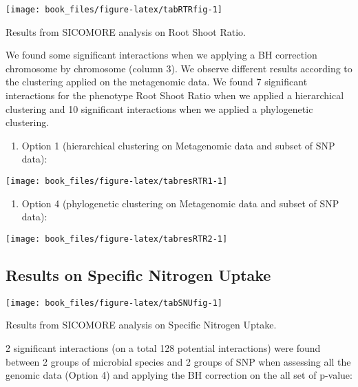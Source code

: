 \documentclass[]{book}
\providecommand{\tightlist}{%
  \setlength{\itemsep}{0pt}\setlength{\parskip}{0pt}}
\begin{document}
\begin{center}\texttt{[image: book\_files/figure-latex/tabRTRfig-1]} \end{center}

\label{tab:tabRTR}Results from SICOMORE analysis on Root Shoot Ratio.

We found some significant interactions when we applying a BH correction
chromosome by chromosome (column 3). We observe different results
according to the clustering applied on the metagenomic data. We found 7
significant interactions for the phenotype Root Shoot Ratio when we
applied a hierarchical clustering and 10 significant interactions when
we applied a phylogenetic clustering.

\begin{enumerate}
\def\labelenumi{\arabic{enumi}.}
\tightlist
\item
  Option 1 (hierarchical clustering on Metagenomic data and subset of SNP data):
\end{enumerate}

\begin{center}\texttt{[image: book\_files/figure-latex/tabresRTR1-1]} \end{center}

\begin{enumerate}
\def\labelenumi{\arabic{enumi}.}
\setcounter{enumi}{1}
\tightlist
\item
  Option 4 (phylogenetic clustering on Metagenomic data and subset of SNP data):
\end{enumerate}

\begin{center}\texttt{[image: book\_files/figure-latex/tabresRTR2-1]} \end{center}

\hypertarget{results-on-specific-nitrogen-uptake}{%
\subsection{Results on Specific Nitrogen Uptake}\label{results-on-specific-nitrogen-uptake}}

\begin{center}\texttt{[image: book\_files/figure-latex/tabSNUfig-1]} \end{center}

\label{tab:tabSNU}Results from SICOMORE analysis on Specific Nitrogen Uptake.

2 significant interactions (on a total 128 potential interactions) were
found between 2 groups of microbial species and 2 groups of SNP when
assessing all the genomic data (Option 4) and applying the BH correction
on the all set of p-value:
\end{document}
